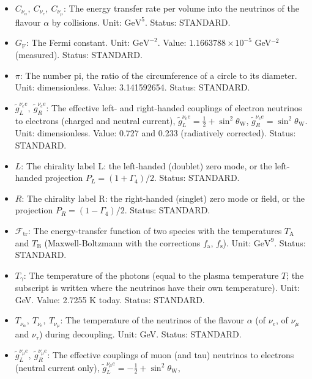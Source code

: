 \documentclass[
  10pt,
]{article}
\providecommand{\tightlist}{%
  \setlength{\itemsep}{0pt}\setlength{\parskip}{0pt}}
\begin{document}
\begin{itemize}
\tightlist
\item
  \(C_{\nu_\alpha},\ C_{\nu_e},\ C_{\nu_\mu}\): The energy transfer rate
  per volume into the neutrinos of the flavour \(\alpha\) by collisions.
  Unit: \(\mathrm{GeV}^{5}\). Status: STANDARD.
\item
  \(G_{\mathrm{F}}\): The Fermi constant. Unit: \(\mathrm{GeV}^{-2}\).
  Value: \(1.1663788\times10^{-5}\) GeV\(^{-2}\) (measured). Status:
  STANDARD.
\item
  \(\pi\): The number pi, the ratio of the circumference of a circle to
  its diameter. Unit: dimensionless. Value: 3.141592654. Status:
  STANDARD.
\item
  \(\tilde g^{\nu_e e}_L,\ \tilde g^{\nu_e e}_R\): The effective left-
  and right-handed couplings of electron neutrinos to electrons (charged
  and neutral current),
  \(\tilde g^{\nu_e e}_L = \frac12 + \sin^2\theta_{\mathrm{W}}\),
  \(\tilde g^{\nu_e e}_R = \sin^2\theta_{\mathrm{W}}\). Unit:
  dimensionless. Value: 0.727 and 0.233 (radiatively corrected). Status:
  STANDARD.
\item
  \(L\): The chirality label L: the left-handed (doublet) zero mode, or
  the left-handed projection \(P_L = (1 + \Gamma_4)/2\). Status:
  STANDARD.
\item
  \(R\): The chirality label R: the right-handed (singlet) zero mode or
  field, or the projection \(P_R = (1 - \Gamma_4)/2\). Status: STANDARD.
\item
  \(\mathcal{F}_{\mathrm{tr}}\): The energy-transfer function of two
  species with the temperatures \(T_{\mathrm{A}}\) and
  \(T_{\mathrm{B}}\) (Maxwell-Boltzmann with the corrections
  \(f_{\mathrm{a}}\), \(f_{\mathrm{s}}\)). Unit: \(\mathrm{GeV}^{9}\).
  Status: STANDARD.
\item
  \(T_\gamma\): The temperature of the photons (equal to the plasma
  temperature \(T\); the subscript is written where the neutrinos have
  their own temperature). Unit: GeV. Value: 2.7255 K today. Status:
  STANDARD.
\item
  \(T_{\nu_\alpha},\ T_{\nu_e},\ T_{\nu_\mu}\): The temperature of the
  neutrinos of the flavour \(\alpha\) (of \(\nu_e\), of \(\nu_\mu\) and
  \(\nu_\tau\)) during decoupling. Unit: GeV. Status: STANDARD.
\item
  \(\tilde g^{\nu_\mu e}_L,\ \tilde g^{\nu_\mu e}_R\): The effective
  couplings of muon (and tau) neutrinos to electrons (neutral current
  only),
  \(\tilde g^{\nu_\mu e}_L = -\frac12 + \sin^2\theta_{\mathrm{W}}\),

\end{itemize}
\end{document}
